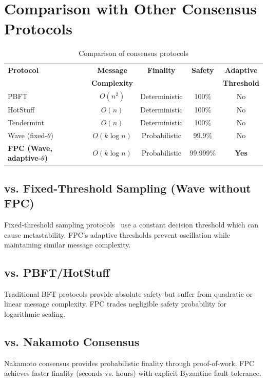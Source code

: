 \section{Comparison with Other Consensus Protocols}

\label{sec:comparison}

\begin{table}[h]
\centering
\begin{tabular}{lcccc}
\toprule
\textbf{Protocol} & \textbf{Message} & \textbf{Finality} & \textbf{Safety} & \textbf{Adaptive} \\
& \textbf{Complexity} & & & \textbf{Threshold} \\
\midrule
PBFT & $O(n^2)$ & Deterministic & 100\% & No \\
HotStuff & $O(n)$ & Deterministic & 100\% & No \\
Tendermint & $O(n)$ & Deterministic & 100\% & No \\
Wave (fixed-$\theta$)~\cite{rocket2018wave} & $O(k \log n)$ & Probabilistic & 99.9\% & No \\
\textbf{FPC (Wave, adaptive-$\theta$)} & $O(k \log n)$ & Probabilistic & 99.999\% & \textbf{Yes} \\
\bottomrule
\end{tabular}
\caption{Comparison of consensus protocols}
\label{tab:comparison}
\end{table}

\subsection{vs. Fixed-Threshold Sampling (Wave without FPC)}

Fixed-threshold sampling protocols~\cite{rocket2018wave} use a constant decision threshold which can cause metastability. FPC's adaptive thresholds prevent oscillation while maintaining similar message complexity.

\subsection{vs. PBFT/HotStuff}

Traditional BFT protocols provide absolute safety but suffer from quadratic or linear message complexity. FPC trades negligible safety probability for logarithmic scaling.

\subsection{vs. Nakamoto Consensus}

Nakamoto consensus provides probabilistic finality through proof-of-work. FPC achieves faster finality (seconds vs. hours) with explicit Byzantine fault tolerance.

